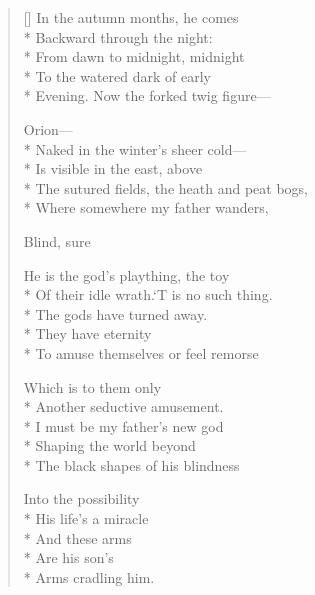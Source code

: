 \label{ch:lear_be}
\settowidth{\versewidth}{Of their idle wrath.\qquad `T is no such thing.}
\begin{verse}[\versewidth]
 In the autumn months, he comes\\*
Backward through the night:\\*
From dawn to midnight, midnight\\*
To the watered dark of early\\*
Evening.   Now the forked twig figure---

\hspace*{3\vgap} Orion---\\*
Naked in the winter's sheer cold---\\*
Is visible in the east, above\\*
The sutured fields, the heath and peat bogs,\\*
Where somewhere my father wanders,

Blind, sure

He is the god's plaything, the toy\\*
Of their idle wrath.\qquad `T is no such thing.\\*
The gods have turned away.\\*
They have eternity\\*
To amuse themselves or feel remorse

Which is to them only\\*
Another seductive amusement.\\*
I must be my father's new god\\*
Shaping the world beyond\\*
The black shapes of his blindness

Into the possibility\\*
His life's a miracle\\*
And these arms\\*
Are his son's\\*
Arms cradling him.
\end{verse}
